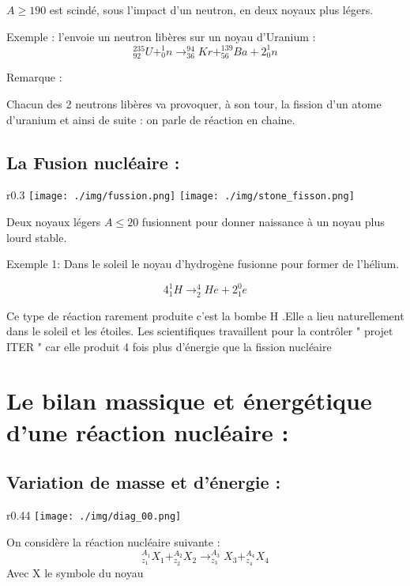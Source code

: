 \documentclass[12pt]{article}
\begin{document}
$A\geq190$ est
scindé, sous l’impact d’un neutron, en deux noyaux plus légers.

Exemple : l’envoie un neutron libères sur un noyau d’Uranium :
$$ _{92}^{235}U + _0^1n \rightarrow _{36}^94Kr + _{56}^{139}Ba + 2_0^1n$$

Remarque :

 Chacun des 2 neutrons libères va provoquer, à son tour, la fission d’un atome
d’uranium et ainsi de suite : on parle de réaction en chaine.

\subsection{La Fusion nucléaire : }

\begin{wrapfigure}[11]{r}{0.3\textwidth}
	\vspace{-2cm}
	\texttt{[image: ./img/fussion.png]}
	\texttt{[image: ./img/stone\_fisson.png]}
\end{wrapfigure}



Deux noyaux légers $A \leq 20$ fusionnent pour donner naissance à un noyau plus
lourd stable. 

Exemple 1: Dans le soleil le noyau d'hydrogène fusionne pour former de l'hélium.

$$4_1^1H \rightarrow _2^4He + 2_1^0e$$

Ce type de réaction rarement produite c’est la bombe H .Elle a lieu naturellement
dans le soleil et les étoiles. Les scientifiques travaillent pour la contrôler "  projet
ITER  " car elle produit 4 fois plus d’énergie que la fission nucléaire

\section{Le bilan massique et énergétique d'une réaction nucléaire : }

\subsection{Variation de masse et d’énergie :}
\begin{wrapfigure}[5]{r}{0.44\textwidth}
	\texttt{[image: ./img/diag\_00.png]}
\end{wrapfigure}


On considère la réaction nucléaire suivante :
$$_{z_1}^{A_1}X_1 + _{z_2}^{A_2}X_2 \rightarrow _{z_3}^{A_3}X_3 + _{z_4}^{A_4}X_4 $$
Avec X le symbole du noyau 
\end{document}
